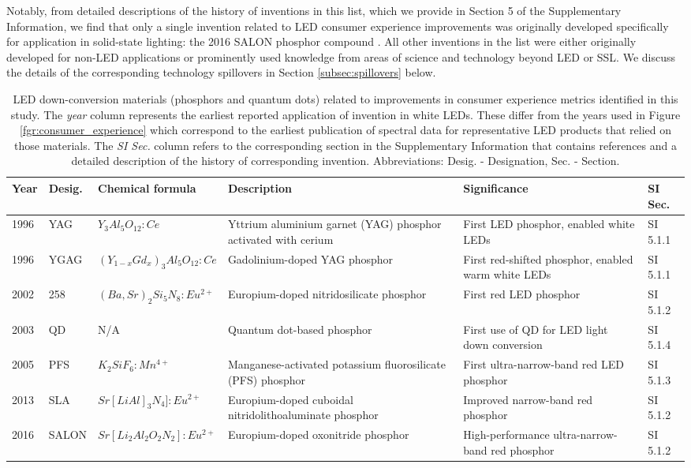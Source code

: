 \documentclass[journal=jacsat,manuscript=article]{achemso}
\begin{document}
Notably, from detailed descriptions of the history of inventions in this list, which we provide in Section 5 of the Supplementary Information, we find that only a single invention related to LED consumer experience improvements was originally developed specifically for application in solid-state lighting: the 2016 SALON phosphor compound \cite{seibald2019phosphor}\cite{Hoerder2019}. All other inventions in the list were either originally developed for non-LED applications or prominently used knowledge from areas of science and technology beyond LED or SSL. We discuss the details of the corresponding technology spillovers in Section \ref{subsec:spillovers} below. 

\begin{table}[h!]
    \small
    \centering
    \begin{tabularx}{\textwidth}{|l|l|l|X|X|l|}
    \hline
        \textbf{Year} & \textbf{Desig.} & \textbf{Chemical formula} & \textbf{Description} & \textbf{Significance} & \textbf{SI Sec.} \\ \hline
        1996 & YAG & $Y_3 Al_5 O_{12}:Ce$ & Yttrium aluminium garnet (YAG) phosphor activated with cerium & First LED phosphor, enabled white LEDs & SI 5.1.1 \\ \hline
        1996 & YGAG & $(Y_{1-x} Gd_x)_3 Al_5 O_{12}:Ce$ & Gadolinium-doped YAG phosphor & First red-shifted phosphor, enabled warm white LEDs & SI 5.1.1 \\ \hline
        2002 & 258 & $(Ba,Sr)_2 Si_5 N_8:Eu^{2+}$ & Europium-doped nitridosilicate phosphor & First red LED phosphor & SI 5.1.2 \\ \hline
        2003 & QD & N/A & Quantum dot-based phosphor & First use of QD for LED light down conversion & SI 5.1.4 \\ \hline
        2005 & PFS & $K_2 SiF_6: Mn^{4+}$ & Manganese-activated potassium fluorosilicate (PFS) phosphor & First ultra-narrow-band red LED phosphor & SI 5.1.3 \\ \hline
        2013 & SLA & $Sr[Li Al]_3 N_4 ]:Eu^{2+}$ & Europium-doped cuboidal nitridolithoaluminate phosphor & Improved narrow-band red phosphor & SI 5.1.2 \\ \hline
        2016 & SALON & $Sr[Li_2 Al_2 O_2 N_2]:Eu^{2+}$ & Europium-doped oxonitride phosphor & High-performance ultra-narrow-band red phosphor & SI 5.1.2 \\ \hline
    \end{tabularx}
    \caption{LED down-conversion materials (phosphors and quantum dots) related to improvements in consumer experience metrics identified in this study. The \textit{year} column represents the earliest reported application of invention in white LEDs. These differ from the years used in Figure \ref{fgr:consumer_experience} which correspond to the earliest publication of spectral data for representative LED products that relied on those materials. The \textit{SI Sec.} column refers to the corresponding section in the Supplementary Information that contains references and a detailed description of the history of corresponding invention. Abbreviations: Desig. - Designation, Sec. - Section.}
    \label{tab:phosphors}
\end{table}
\end{document}
